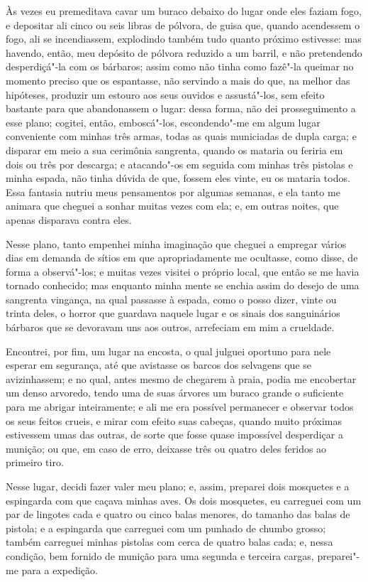 Às vezes eu premeditava cavar um buraco debaixo do lugar onde eles
faziam fogo, e depositar ali cinco ou seis libras de pólvora, de guisa
que, quando acendessem o fogo, ali se incendiassem, explodindo também
tudo quanto próximo estivesse: mas havendo, então, meu depósito de
pólvora reduzido a um barril, e não pretendendo desperdiçá"-la com os
bárbaros; assim como não tinha como fazê"-la queimar no momento preciso
que os espantasse, não servindo a mais do que, na melhor das hipóteses,
produzir um estouro aos seus ouvidos e assustá"-los, sem efeito bastante
para que abandonassem o lugar: dessa forma, não dei prosseguimento a
esse plano; cogitei, então, emboscá"-los, escondendo"-me em algum lugar
conveniente com minhas três armas, todas as quais municiadas de dupla
carga; e disparar em meio a sua cerimônia sangrenta, quando os mataria
ou feriria em dois ou três por descarga; e atacando"-os em seguida com
minhas três pistolas e minha espada, não tinha dúvida de que, fossem
eles vinte, eu os mataria todos. Essa fantasia nutriu meus pensamentos
por algumas semanas, e ela tanto me animara que cheguei a sonhar muitas
vezes com ela; e, em outras noites, que apenas disparava contra eles.

Nesse plano, tanto empenhei minha imaginação que cheguei a empregar
vários dias em demanda de sítios em que apropriadamente me ocultasse,
como disse, de forma a observá"-los; e muitas vezes visitei o próprio
local, que então se me havia tornado conhecido; mas enquanto minha mente
se enchia assim do desejo de uma sangrenta vingança, na qual passasse à
espada, como o posso dizer, vinte ou trinta deles, o horror que guardava
naquele lugar e os sinais dos sanguinários bárbaros que se devoravam uns
aos outros, arrefeciam em mim a crueldade.

Encontrei, por fim, um lugar na encosta, o qual julguei oportuno para
nele esperar em segurança, até que avistasse os barcos dos selvagens que
se avizinhassem; e no qual, antes mesmo de chegarem à praia, podia me
encobertar um denso arvoredo, tendo uma de suas árvores um buraco grande
o suficiente para me abrigar inteiramente; e ali me era possível
permanecer e observar todos os seus feitos crueis, e mirar com efeito
suas cabeças, quando muito próximas estivessem umas das outras, de sorte
que fosse quase impossível desperdiçar a munição; ou que, em caso de
erro, deixasse três ou quatro deles feridos ao primeiro tiro.

Nesse lugar, decidi fazer valer meu plano; e, assim, preparei dois
mosquetes e a espingarda com que caçava minhas aves. Os dois mosquetes,
eu carreguei com um par de lingotes cada e quatro ou cinco balas
menores, do tamanho das balas de pistola; e a espingarda que carreguei
com um punhado de chumbo grosso; também carreguei minhas pistolas com
cerca de quatro balas cada; e, nessa condição, bem fornido de munição
para uma segunda e terceira cargas, preparei"-me para a expedição.

